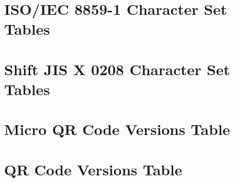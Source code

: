 \documentclass[../2_codex]{subfiles}
\begin{document}
\chapter{ISO/IEC 8859-1 Character Set Tables}
\label{app:ISO-IEC-8859-1}



\chapter{Shift JIS X 0208 Character Set Tables}
\label{app:Shift-JIS-X-0208}



\chapter{Micro QR Code Versions Table}
\label{app:qr-versions-micro}



\chapter{QR Code Versions Table}
\label{app:qr-versions}


\end{document}
